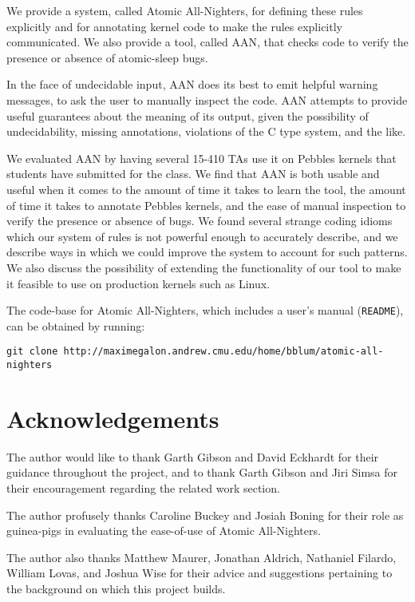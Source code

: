 \documentclass{article}
\begin{document}
We provide a system, called Atomic All-Nighters, for defining these rules explicitly and for annotating kernel code to make the rules explicitly communicated. We also provide a tool, called AAN, that checks code to verify the presence or absence of atomic-sleep bugs.

In the face of undecidable input, AAN does its best to emit helpful warning messages, to ask the user to manually inspect the code. AAN attempts to provide useful guarantees about the meaning of its output, given the possibility of undecidability, missing annotations, violations of the C type system, and the like.

We evaluated AAN by having several 15-410 TAs use it on Pebbles kernels that students have submitted for the class. We find that AAN is both usable and useful when it comes to the amount of time it takes to learn the tool, the amount of time it takes to annotate Pebbles kernels, and the ease of manual inspection to verify the presence or absence of bugs.
We found several strange coding idioms which our system of rules is not powerful enough to accurately describe, and we describe ways in which we could improve the system to account for such patterns.
We also discuss the possibility of extending the functionality of our tool to make it feasible to use on production kernels such as Linux.

The code-base for Atomic All-Nighters, which includes a user's manual (\texttt{README}), can be obtained by running:
\begin{center}
	{\tt git clone http://maximegalon.andrew.cmu.edu/home/bblum/atomic-all-nighters}
\end{center}


\section{Acknowledgements}

The author would like to thank Garth Gibson and David Eckhardt for their guidance throughout the project, and to thank Garth Gibson and Jiri Simsa for their encouragement regarding the related work section.

The author profusely thanks Caroline Buckey and Josiah Boning for their role as guinea-pigs in evaluating the ease-of-use of Atomic All-Nighters.

The author also thanks Matthew Maurer, Jonathan Aldrich, Nathaniel Filardo, William Lovas, and Joshua Wise for their advice and suggestions pertaining to the background on which this project builds.
\end{document}
